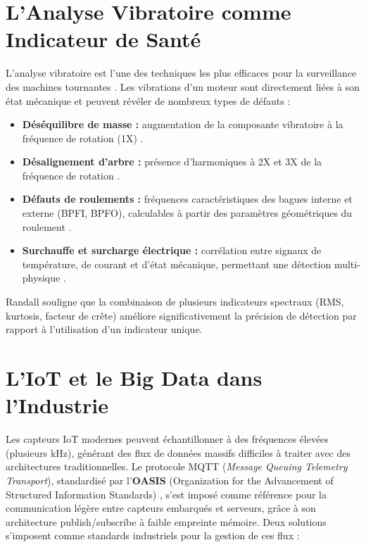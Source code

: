 \documentclass[12pt, a4paper, oneside]{report}
\begin{document}
\section{L'Analyse Vibratoire comme Indicateur de Santé}

L'analyse vibratoire est l'une des techniques les plus efficaces pour la surveillance des
machines tournantes \cite{randall2011}. Les vibrations d'un moteur sont directement liées
à son état mécanique et peuvent révéler de nombreux types de défauts :

\begin{itemize}
  \item \textbf{Déséquilibre de masse :} augmentation de la composante vibratoire à la fréquence
  de rotation (1X) \cite{randall2011}.
  \item \textbf{Désalignement d'arbre :} présence d'harmoniques à 2X et 3X de la fréquence de rotation \cite{dewell1984}.
  \item \textbf{Défauts de roulements :} fréquences caractéristiques des bagues interne et externe
  (BPFI, BPFO), calculables à partir des paramètres géométriques du roulement \cite{randallandantoni2011}.
  \item \textbf{Surchauffe et surcharge électrique :} corrélation entre signaux de température,
  de courant et d'état mécanique, permettant une détection multi-physique \cite{lee2014}.
\end{itemize}

Randall \cite{randall2011} souligne que la combinaison de plusieurs indicateurs spectraux
(RMS, kurtosis, facteur de crête) améliore significativement la précision de détection par
rapport à l'utilisation d'un indicateur unique.

\section{L'IoT et le Big Data dans l'Industrie}

Les capteurs IoT modernes peuvent échantillonner à des fréquences élevées (plusieurs kHz),
générant des flux de données massifs difficiles à traiter avec des architectures traditionnelles.
Le protocole MQTT (\textit{Message Queuing Telemetry Transport}), standardisé par l'\textbf{OASIS}
(Organization for the Advancement of Structured Information Standards) \cite{mqtt}, s'est imposé
comme référence pour la communication légère entre capteurs embarqués et serveurs, grâce à son
architecture publish/subscribe à faible empreinte mémoire. Deux solutions s'imposent comme
standards industriels pour la gestion de ces flux :
\end{document}
